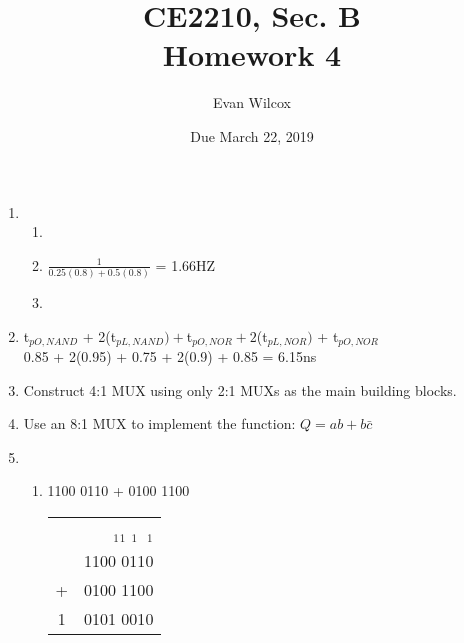 \documentclass[a4paper]{article}
\title{CE2210, Sec. B \\Homework 4}
\author{Evan Wilcox}
\date{Due March 22, 2019}
\begin{document}
    \maketitle

    \begin{enumerate}
        
        \item
        \begin{enumerate}

            \item
            

            \item \vspace{4cm}$\frac{1}{0.25(0.8) + 0.5(0.8)}$ = 1.66HZ


            \item 
            \vspace{4cm}

        \end{enumerate}
        \vspace{4cm}

        \item t$_{pO, NAND}$ + 2(t$_{pL, NAND}) + $t$_{pO, NOR} + 2$(t$_{pL, NOR})$ + t$_{pO, NOR}$ \\
        0.85 + 2(0.95) + 0.75 + 2(0.9) + 0.85 = 6.15ns

        \newpage
        \item Construct 4:1 MUX using only 2:1 MUXs as the main building blocks.

        \vspace{10cm}
        \item Use an 8:1 MUX to implement the function: $Q=ab+b\bar{c}$ \\
        
        \newpage
        \item 
        \begin{enumerate}
            
            \item 1100 0110 + 0100 1100 \\
            \begin{tabular}{ c r }
                  & $_{1}$$_{1}$ $_{1}$ $\:$$_{1}$\phantom{spa} \\ 
                  & 1100 0110\\  
                + & 0100 1100\\ \hline
                1 & 0101 0010
            \end{tabular} \\


\end{enumerate}
\end{enumerate}
\end{document}
